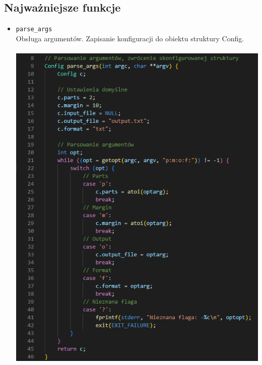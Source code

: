 \documentclass{article}
\begin{document}
    
    
    \subsection{Najważniejsze funkcje}
    
    \begin{itemize}
    
        \item \texttt{parse\_args} \\
        Obsługa argumentów. Zapisanie konfiguracji do obiektu struktury Config. \\\\      \includegraphics[width=0.825\linewidth, center]{img/parse_args.png}


\end{itemize}
\end{document}
